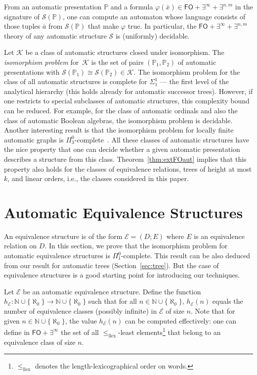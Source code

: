 \documentclass[envcountsame]{llncs}
\newcommand{\E}{\mathcal E}
\newcommand{\FO}{\mathsf{FO}}
\newcommand{\N}{\mathbb N}
\newcommand{\K}{\mathcal K}
\renewcommand{\P}{{\mathbb P}}
\renewcommand{\S}{\mathcal S}
\begin{document}
\begin{theorem}\label{thm:extFOaut} 
  From an automatic presentation $\P$ and a formula $\varphi(\bar
  x)\in \FO+\exists ^{\infty} +\exists^{n,m}$ in the signature of
  $\S(\P)$, one can compute an automaton whose language consists of
  those tuples $\bar{a}$ from $\S(\P)$ that make $\varphi$ true. In
  particular, the $\FO+\exists^\infty+\exists^{n,m}$ theory of any
  automatic structure $\S$ is (uniformly) decidable. 
\end{theorem}
Let $\K$ be a class of automatic structures closed under
isomorphism. The {\em isomorphism problem} for~$\K$ is the set of
pairs $(\P_1,\P_2)$ of automatic presentations with
$\S(\P_1)\cong\S(\P_2)\in\K$. The isomorphism problem for the class 
of all automatic structures is complete for $\Sigma^1_1$ --- the first level
of the analytical hierarchy \cite{KhoNRS07} (this holds already for
automatic successor trees). However, if one restricts to special subclasses of
automatic structures, this complexity bound can be reduced. For
example, for the class of automatic ordinals and also the class of
automatic Boolean algebras, the isomorphism problem is decidable.
Another interesting result is that the isomorphism problem for locally
finite automatic graphs is $\Pi^0_3$-complete~\cite{Rub04}.
All these classes of
automatic structures have the nice property that one can decide
whether a given automatic presentation describes a structure from
this class. Theorem~\ref{thm:extFOaut} implies that this property
also holds for the classes of equivalence relations, trees of
height at most $k$, and linear orders, i.e., the classes considered
in this paper.


\section{Automatic Equivalence Structures}\label{sec:equiv}

An equivalence structure is of the form $\E=(D; E)$ where $E$ is an
equivalence relation on $D$.
In this section, we prove that the isomorphism problem for automatic
equivalence structures is $\Pi^0_1$-complete. This result can
be also deduced from our result for automatic trees (Section~\ref{sec:tree}).
But the case of equivalence structures is a good starting point for
introducing our techniques.

Let $\E$ be an automatic equivalence structure. Define the function
$h_\E:\N\cup\{\aleph_0\} \rightarrow \N\cup \{\aleph_0\}$ such that
for all $n\in \N\cup \{\aleph_0\}$, $h_\E(n)$ equals the number of
equivalence classes (possibly infinite) in $\E$ of size $n$. Note
that for given $n\in \N\cup \{\aleph_0\}$, the value $h_\E(n)$ can be
computed effectively: one can define in $\FO+\exists^\infty$ the set
of all $\leq_{\text{llex}}$-least elements\footnote{$\leq_{\text{llex}}$ denotes the
  length-lexicographical order on words.} that belong to an
equivalence class of size $n$.
\end{document}
